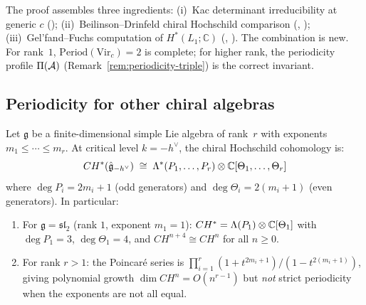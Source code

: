 \begin{remark}[Scope]
The proof assembles three ingredients: (i)~Kac determinant irreducibility at generic $c$ (\ClaimStatusProvedElsewhere); (ii)~Beilinson--Drinfeld chiral Hochschild comparison (\ClaimStatusProvedElsewhere, \cite{BD04}); (iii)~Gel'fand--Fuchs computation of $H^*(L_1; \mathbb{C})$ (\ClaimStatusProvedElsewhere, \cite{Fuks86}).  The combination is new.  For rank~$1$, $\mathrm{Period}(\mathrm{Vir}_c) = 2$ is complete; for higher rank, the periodicity profile $\Pi(\mathcal{A})$ (Remark~\ref{rem:periodicity-triple}) is the correct invariant.
\end{remark}

\subsection{Periodicity for other chiral algebras}

\begin{theorem}
\label{thm:affine-periodicity-critical}
Let $\mathfrak{g}$ be a finite-dimensional simple Lie algebra of rank~$r$
with exponents $m_1 \leq \cdots \leq m_r$.
At critical level $k = -h^{\vee}$, the chiral Hochschild cohomology is:
\[
CH^*(\hat{\mathfrak{g}}_{-h^{\vee}}) \;\cong\;
\Lambda^*(P_1, \ldots, P_r) \otimes \mathbb{C}[\Theta_1, \ldots, \Theta_r]
\]
where $\deg P_i = 2m_i + 1$ (odd generators) and $\deg\Theta_i = 2(m_i + 1)$
(even generators).  In particular:
\begin{enumerate}
\item For $\mathfrak{g} = \mathfrak{sl}_2$ (rank $1$, exponent $m_1 = 1$):
$CH^* = \Lambda(P_1) \otimes \mathbb{C}[\Theta_1]$ with $\deg P_1 = 3$,
$\deg\Theta_1 = 4$, and $CH^{n+4} \cong CH^n$ for all $n \geq 0$.
\item For rank $r > 1$: the Poincar\'e series is
$\prod_{i=1}^r (1 + t^{2m_i+1})/(1-t^{2(m_i+1)})$, giving polynomial
growth $\dim CH^n = O(n^{r-1})$ but \emph{not} strict periodicity when
the exponents are not all equal.
\end{enumerate}
\end{theorem}

